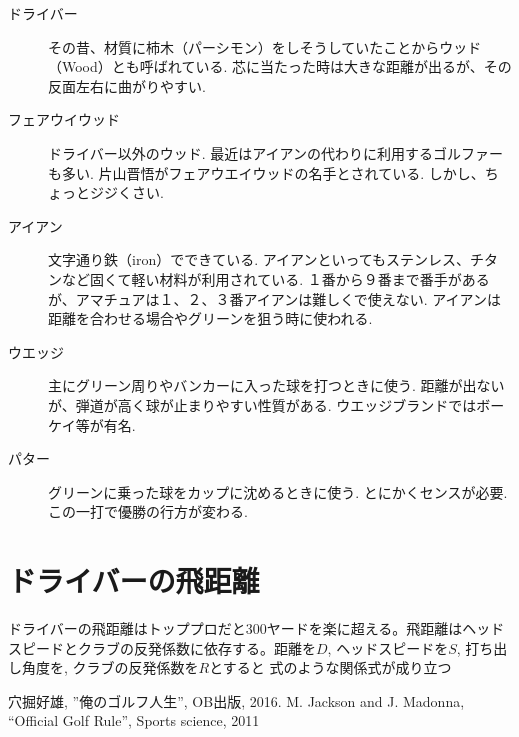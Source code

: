 \documentclass[a4j, twocolumn]{jarticle}
\begin{document}
\begin{description}
  \item[ドライバー] その昔、材質に柿木（パーシモン）をしそうしていたことからウッド（Wood）とも呼ばれている. 芯に当たった時は大きな距離が出るが、その反面左右に曲がりやすい. 
  \item[フェアウイウッド] ドライバー以外のウッド. 最近はアイアンの代わりに利用するゴルファーも多い. 片山晋悟がフェアウエイウッドの名手とされている. しかし、ちょっとジジくさい.   
  \item[アイアン] 文字通り鉄（iron）でできている. アイアンといってもステンレス、チタンなど固くて軽い材料が利用されている. １番から９番まで番手があるが、アマチュアは１、２、３番アイアンは難しくで使えない. アイアンは距離を合わせる場合やグリーンを狙う時に使われる. 
  \item[ウエッジ] 主にグリーン周りやバンカーに入った球を打つときに使う. 距離が出ないが、弾道が高く球が止まりやすい性質がある. ウエッジブランドではボーケイ等が有名.
  \item[パター] グリーンに乗った球をカップに沈めるときに使う. とにかくセンスが必要. この一打で優勝の行方が変わる.
\end{description}

\section{ドライバーの飛距離}
ドライバーの飛距離はトッププロだと300ヤードを楽に超える。飛距離はヘッドスピードとクラブの反発係数に依存する。距離を$D$, ヘッドスピードを$S$, 打ち出し角度を\theta, クラブの反発係数を$R$とすると 式のような関係式が成り立つ\cite{GOLFRULE}
\begin{thebibliography}{99}
   穴掘好雄, ''俺のゴルフ人生'', OB出版, 2016.
   M. Jackson and J. Madonna, ``Official Golf Rule'', Sports science, 2011 
\end{thebibliography}
\end{document}
